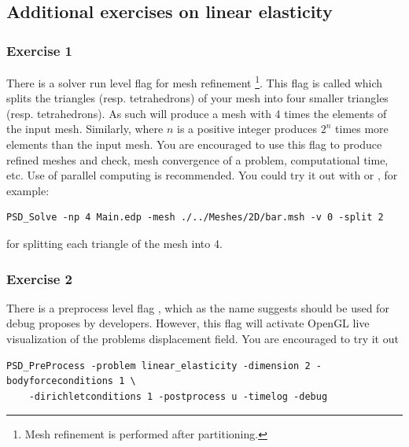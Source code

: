{
\renewcommand{\subsection}{\subsubsection}

}


\subsection{Additional exercises on linear elasticity}
\subsubsection{Exercise  1}

There is a solver run level flag for mesh refinement \footnote{Mesh refinement is performed after partitioning.}. This flag is called  which splits the triangles (resp. tetrahedrons) of your mesh into  four smaller  triangles (resp. tetrahedrons). As such  will produce a mesh with 4 times the elements of the input mesh. Similarly,  where $n$ is a positive integer produces $2^n$ times more elements than the input mesh. You are encouraged to use this  flag to produce refined meshes and check, mesh convergence of a problem, computational time, etc. Use of parallel computing is recommended. You could try it out with  or , for example:

\begin{lstlisting}[style=BashInputStyle]
	PSD_Solve -np 4 Main.edp -mesh ./../Meshes/2D/bar.msh -v 0 -split 2
\end{lstlisting}

for splitting each triangle of the mesh   into 4. 


\subsubsection{Exercise  2}

There is a preprocess level flag , which as the name suggests should be used for debug proposes by developers. However, this flag will activate OpenGL live visualization of the problems displacement field. You are encouraged to try it out 

\begin{lstlisting}[style=BashInputStyle]
	PSD_PreProcess -problem linear_elasticity -dimension 2 -bodyforceconditions 1 \
	-dirichletconditions 1 -postprocess u -timelog -debug
\end{lstlisting}

